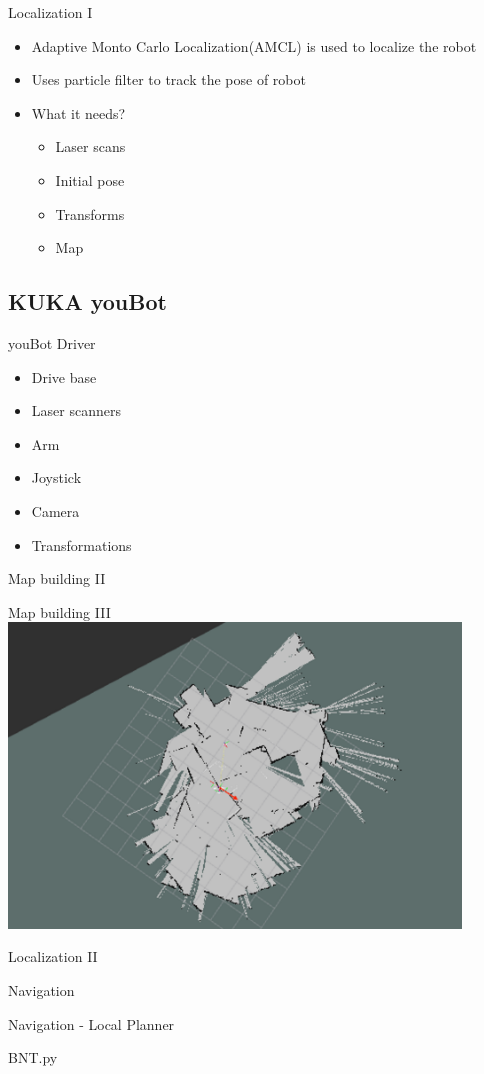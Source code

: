 \documentclass[12pt,aspectratio=43,xcolor={usenames,dvipsnames,table}]{beamer}
\begin{document}
\begin{frame}{Localization I}
\begin{itemize}
	\item Adaptive Monto Carlo Localization(AMCL) is used to localize the robot
	\item Uses particle filter to track the pose of robot
	\item What it needs?
		\begin{itemize}
			\item Laser scans
			\item Initial pose
			\item Transforms
			\item Map 
		\end{itemize}
\end{itemize}
\end{frame}
\subsection{KUKA youBot}
\begin{frame}{youBot Driver}
\begin{itemize}
	\item Drive base
	\item Laser scanners
	\item Arm 
	\item Joystick
	\item Camera
	\item Transformations

\end{itemize}
\end{frame}
\begin{frame}{Map building II}
\end{frame}
\begin{frame}{Map building III}
    \centering
    \includegraphics[width=0.9\textwidth]{gfx/map_messy.png}
\end{frame}
\begin{frame}{Localization II}
\end{frame}
\begin{frame}{Navigation}
\end{frame}
\begin{frame}{Navigation - Local Planner}
\end{frame}
\begin{frame}{BNT.py}
\end{frame}
\end{document}
